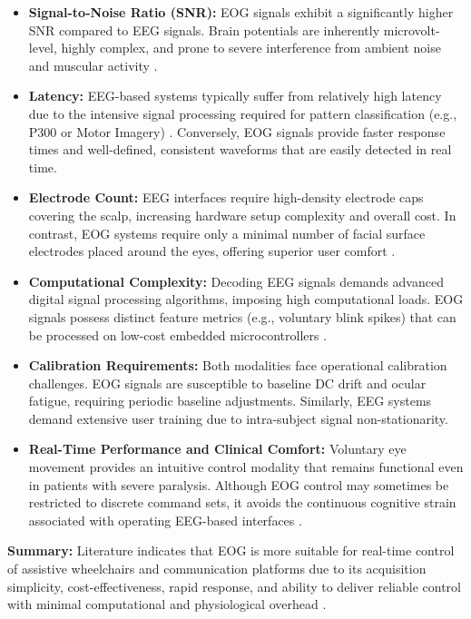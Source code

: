\begin{itemize}
    \item \textbf{Signal-to-Noise Ratio (SNR):} EOG signals exhibit a significantly higher SNR compared to EEG signals. Brain potentials are inherently microvolt-level, highly complex, and prone to severe interference from ambient noise and muscular activity \cite{onesensor2014proposals}.
    \item \textbf{Latency:} EEG-based systems typically suffer from relatively high latency due to the intensive signal processing required for pattern classification (e.g., P300 or Motor Imagery) \cite{wolpaw2002bci}. Conversely, EOG signals provide faster response times and well-defined, consistent waveforms that are easily detected in real time.
    \item \textbf{Electrode Count:} EEG interfaces require high-density electrode caps covering the scalp, increasing hardware setup complexity and overall cost. In contrast, EOG systems require only a minimal number of facial surface electrodes placed around the eyes, offering superior user comfort \cite{barea2002eog}.
    \item \textbf{Computational Complexity:} Decoding EEG signals demands advanced digital signal processing algorithms, imposing high computational loads. EOG signals possess distinct feature metrics (e.g., voluntary blink spikes) that can be processed on low-cost embedded microcontrollers \cite{kumar2016eog}.
    \item \textbf{Calibration Requirements:} Both modalities face operational calibration challenges. EOG signals are susceptible to baseline DC drift and ocular fatigue, requiring periodic baseline adjustments. Similarly, EEG systems demand extensive user training due to intra-subject signal non-stationarity.
    \item \textbf{Real-Time Performance and Clinical Comfort:} Voluntary eye movement provides an intuitive control modality that remains functional even in patients with severe paralysis. Although EOG control may sometimes be restricted to discrete command sets, it avoids the continuous cognitive strain associated with operating EEG-based interfaces \cite{hosni2018eeg}.
\end{itemize}

\textbf{Summary:} Literature indicates that EOG is more suitable for real-time control of assistive wheelchairs and communication platforms due to its acquisition simplicity, cost-effectiveness, rapid response, and ability to deliver reliable control with minimal computational and physiological overhead \cite{onesensor2014proposals, hosni2018eeg}.

